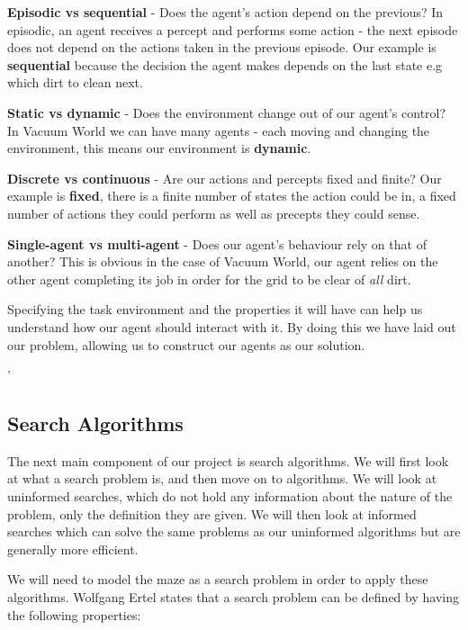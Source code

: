 \documentclass[]{final_report}
\begin{document}
\textbf{Episodic vs sequential} - Does the agent's action depend on the previous? In episodic, an agent receives a percept and performs some action - the next episode does not depend on the actions taken in the previous episode. Our example is \textbf{sequential} because the decision the agent makes depends on the last state e.g which dirt to clean next.

\textbf{Static vs dynamic} - Does the environment change out of our agent's control? In Vacuum World we can have many agents - each moving and changing the environment, this means our environment is \textbf{dynamic}.

\textbf{Discrete vs continuous} - Are our actions and percepts fixed and finite? Our example is \textbf{fixed}, there is a finite number of states the action could be in, a fixed number of actions they could perform as well as precepts they could sense.

\textbf{Single-agent vs multi-agent} - Does our agent's behaviour rely on that of another? This is obvious in the case of Vacuum World, our agent relies on the other agent completing its job in order for the grid to be clear of \textit{all} dirt.

Specifying the task environment and the properties it will have can help us understand how our agent should interact with it. By doing this we have laid out our problem, allowing us to construct our agents as our solution. 

'\subsection{Search Algorithms}\label{Search Algortithms}

The next main component of our project is search algorithms. We will first look at what a search problem is, and then move on to algorithms. We will look at uninformed searches, which do not hold any information about the nature of the problem, only the definition they are given. We will then look at informed searches which can solve the same problems as our uninformed algorithms but are generally more efficient. 

We will need to model the maze as a search problem in order to apply these algorithms. Wolfgang Ertel\cite{Ertel_2011} states that a search problem can be defined by having the following properties:
\end{document}
